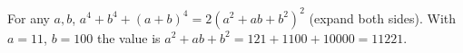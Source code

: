 For any $a,b$, $a^4+b^4+(a+b)^4=2(a^2+ab+b^2)^2$ (expand both sides). With $a=11$, $b=100$ the value is $a^2+ab+b^2=121+1100+10000=\boxed{11221}$.
